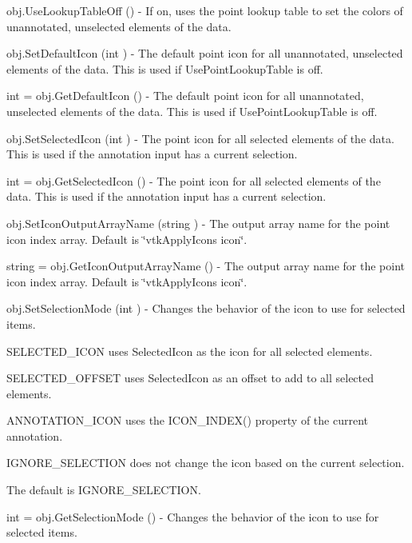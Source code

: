 \begin{DoxyItemize}
\item {\ttfamily obj.\-Use\-Lookup\-Table\-Off ()} -\/ If on, uses the point lookup table to set the colors of unannotated, unselected elements of the data.  
\item {\ttfamily obj.\-Set\-Default\-Icon (int )} -\/ The default point icon for all unannotated, unselected elements of the data. This is used if Use\-Point\-Lookup\-Table is off.  
\item {\ttfamily int = obj.\-Get\-Default\-Icon ()} -\/ The default point icon for all unannotated, unselected elements of the data. This is used if Use\-Point\-Lookup\-Table is off.  
\item {\ttfamily obj.\-Set\-Selected\-Icon (int )} -\/ The point icon for all selected elements of the data. This is used if the annotation input has a current selection.  
\item {\ttfamily int = obj.\-Get\-Selected\-Icon ()} -\/ The point icon for all selected elements of the data. This is used if the annotation input has a current selection.  
\item {\ttfamily obj.\-Set\-Icon\-Output\-Array\-Name (string )} -\/ The output array name for the point icon index array. Default is \char`\"{}vtk\-Apply\-Icons icon\char`\"{}.  
\item {\ttfamily string = obj.\-Get\-Icon\-Output\-Array\-Name ()} -\/ The output array name for the point icon index array. Default is \char`\"{}vtk\-Apply\-Icons icon\char`\"{}.  
\item {\ttfamily obj.\-Set\-Selection\-Mode (int )} -\/ Changes the behavior of the icon to use for selected items. 
\begin{DoxyItemize}
\item S\-E\-L\-E\-C\-T\-E\-D\-\_\-\-I\-C\-O\-N uses Selected\-Icon as the icon for all selected elements. 
\item S\-E\-L\-E\-C\-T\-E\-D\-\_\-\-O\-F\-F\-S\-E\-T uses Selected\-Icon as an offset to add to all selected elements. 
\item A\-N\-N\-O\-T\-A\-T\-I\-O\-N\-\_\-\-I\-C\-O\-N uses the I\-C\-O\-N\-\_\-\-I\-N\-D\-E\-X() property of the current annotation. 
\item I\-G\-N\-O\-R\-E\-\_\-\-S\-E\-L\-E\-C\-T\-I\-O\-N does not change the icon based on the current selection. 
\end{DoxyItemize}The default is I\-G\-N\-O\-R\-E\-\_\-\-S\-E\-L\-E\-C\-T\-I\-O\-N.  
\item {\ttfamily int = obj.\-Get\-Selection\-Mode ()} -\/ Changes the behavior of the icon to use for selected items. 

\end{DoxyItemize}
